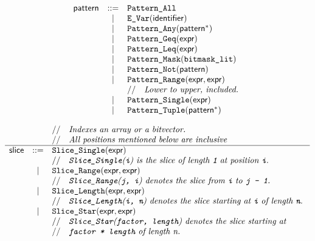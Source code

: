 \documentclass{book}
\begin{document}
\[
\begin{array}{rcl}
\textsf{pattern} &::=& \texttt{Pattern\_All} \\
	&|& \texttt{E\_Var}(\texttt{\textsf{identifier}}) \\
  &|& \texttt{Pattern\_Any}(\textsf{pattern}^{*}) \\
  &|& \texttt{Pattern\_Geq}(\textsf{expr}) \\
  &|& \texttt{Pattern\_Leq}(\textsf{expr}) \\
  &|& \texttt{Pattern\_Mask}(\texttt{bitmask\_lit}) \\
  &|& \texttt{Pattern\_Not}(\textsf{pattern}) \\
  &|& \texttt{Pattern\_Range}(\textsf{expr}, \textsf{expr})\\
  & & //\quad\textit{Lower to upper, included.}\ \\
  &|& \texttt{Pattern\_Single}(\textsf{expr}) \\
  &|& \texttt{Pattern\_Tuple}(\textsf{pattern}^{*}) \\
\end{array}
\]

\[
\begin{array}{rcl}
&&//\quad\textit{Indexes an array or a bitvector.}\ \\
&&//\quad\textit{All positions mentioned below are inclusive}\ \\
\hline
\textsf{slice} &::=& \texttt{Slice\_Single}(\textsf{expr}) \\
  & & //\quad\textit{\texttt{Slice\_Single}(\texttt{i}) is the slice of length \texttt{1} at position \texttt{i}.}\ \\
  &|& \texttt{Slice\_Range}(\textsf{expr}, \textsf{expr}) \\
  & & //\quad\textit{\texttt{Slice\_Range}(\texttt{j, i}) denotes the slice from \texttt{i} to \texttt{j - 1}.}\ \\
  &|& \texttt{Slice\_Length}(\textsf{expr}, \textsf{expr}) \\
  & & //\quad\textit{\texttt{Slice\_Length}(\texttt{i, n}) denotes the slice starting at \texttt{i} of length \texttt{n}.}\ \\
  &|& \texttt{Slice\_Star}(\textsf{expr}, \textsf{expr}) \\
  & & //\quad\textit{\texttt{Slice\_Star}(\texttt{factor, length}) denotes the slice starting at }\ \\
  & & //\quad\textit{\texttt{factor * length} of length n.}\ \\
\end{array}
\]
\end{document}
